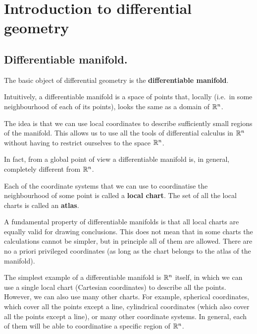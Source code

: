 \chapter{Introduction to differential geometry}

\section{Differentiable manifold.}

\begin{points}
\item The basic object of differential geometry is the \textbf{differentiable manifold}.

\item Intuitively, a differentiable manifold is a space of points that, locally (i.e.\ in some neighbourhood of each of its points), looks the same as a domain of $\mathbb{R}^n$.

\item The idea is that we can use local coordinates to describe sufficiently small regions of the manifold. This allows us to use all the tools of differential calculus in $\mathbb{R}^n$ without having to restrict ourselves to the space $\mathbb{R}^n$.

\item In fact, from a global point of view a differentiable manifold is, in general, completely different from $\mathbb{R}^n$.

\item Each of the coordinate systems that we can use to coordinatise the neighbourhood of some point is called a \textbf{local chart}. The set of all the local charts is called an \textbf{atlas}.

\item A fundamental property of differentiable manifolds is that all local charts are equally valid for drawing conclusions. This does not mean that in some charts the calculations cannot be simpler, but in principle all of them are allowed. There are no a priori privileged coordinates (as long as the chart belongs to the atlas of the manifold).

\item The simplest example of a differentiable manifold is $\mathbb{R}^n$ itself, in which we can use a single local chart (Cartesian coordinates) to describe all the points. However, we can also use many other charts. For example, spherical coordinates, which cover all the points except a line, cylindrical coordinates (which also cover all the points except a line), or many other coordinate systems. In general, each of them will be able to coordinatise a specific region of $\mathbb{R}^n$.


\end{points}
